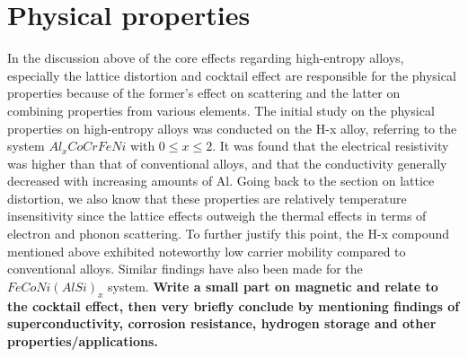 \section{Physical properties}
In the discussion above of the core effects regarding high-entropy alloys, especially the lattice distortion and cocktail effect are responsible for the physical properties because of the former's effect on scattering and the latter on combining properties from various elements. The initial study on the physical properties on high-entropy alloys was conducted on the H-x alloy, referring to the system $Al_xCoCrFeNi$ with $0 \leq x \leq 2$. It was found that the electrical resistivity was higher than that of conventional alloys, and that the conductivity generally decreased with increasing amounts of Al. Going back to the section on lattice distortion, we also know that these properties are relatively temperature insensitivity since the lattice effects outweigh the thermal effects in terms of electron and phonon scattering. To further justify this point, the H-x compound mentioned above exhibited noteworthy low carrier mobility compared to conventional alloys. Similar findings have also been made for the $FeCoNi(AlSi)_x$ system.
\textbf{Write a small part on magnetic and relate to the cocktail effect, then very briefly conclude by mentioning findings of superconductivity, corrosion resistance, hydrogen storage and other properties/applications.}